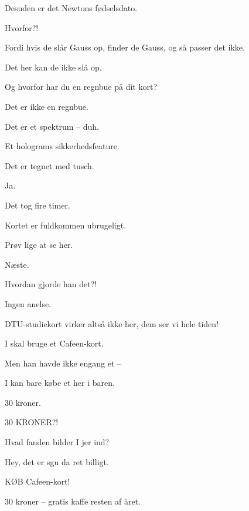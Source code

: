 \documentclass[a4paper,11pt]{article}
\begin{document}
\begin{sketch}
 Desuden er det Newtons fødselsdato.

 Hvorfor?!

 Fordi hvis de slår Gauss op, finder de Gauss, og så passer det ikke.

 Det her kan de ikke slå op.

 Og hvorfor har du en regnbue på dit kort?

 Det er ikke en regnbue.

 Det er et spektrum -- duh.

 Et holograms sikkerhedsfeature.

 Det er tegnet med tusch.

 Ja.

 Det tog fire timer.

 Kortet er fuldkommen ubrugeligt.

 Prøv lige at se her.


 Næste.

 Hvordan gjorde han det?!

 Ingen anelse.


 DTU-studiekort virker altså ikke her, dem ser vi hele tiden!

 I skal bruge et Cafeen-kort.

 Men han havde ikke engang et --

 I kan bare købe et her i baren.

 30 kroner.

 30 KRONER?!

 Hvad fanden bilder I jer ind?

 Hey, det er sgu da ret billigt.


 KØB Cafeen-kort!

 30 kroner -- gratis kaffe resten af året.


\end{sketch}
\end{document}
